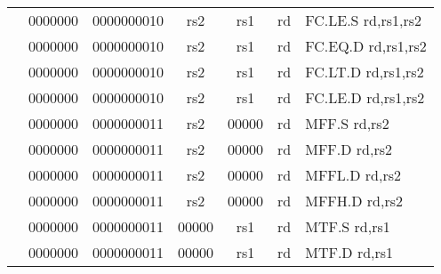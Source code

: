 \begin{table}[p]
\begin{small}
\begin{center}
\begin{tabular}{rcccccccccl}
&
\multicolumn{1}{|c|}{0000000} &
\multicolumn{5}{c|}{0000000010} &
\multicolumn{1}{c|}{rs2} &
\multicolumn{1}{c|}{rs1} &
\multicolumn{1}{c|}{rd} & FC.LE.S rd,rs1,rs2 \\
\cline{2-10}
  

&
\multicolumn{1}{|c|}{0000000} &
\multicolumn{5}{c|}{0000000010} &
\multicolumn{1}{c|}{rs2} &
\multicolumn{1}{c|}{rs1} &
\multicolumn{1}{c|}{rd} & FC.EQ.D rd,rs1,rs2 \\
\cline{2-10}
  

&
\multicolumn{1}{|c|}{0000000} &
\multicolumn{5}{c|}{0000000010} &
\multicolumn{1}{c|}{rs2} &
\multicolumn{1}{c|}{rs1} &
\multicolumn{1}{c|}{rd} & FC.LT.D rd,rs1,rs2 \\
\cline{2-10}
  

&
\multicolumn{1}{|c|}{0000000} &
\multicolumn{5}{c|}{0000000010} &
\multicolumn{1}{c|}{rs2} &
\multicolumn{1}{c|}{rs1} &
\multicolumn{1}{c|}{rd} & FC.LE.D rd,rs1,rs2 \\
\cline{2-10}
  

&
\multicolumn{1}{|c|}{0000000} &
\multicolumn{5}{c|}{0000000011} &
\multicolumn{1}{c|}{rs2} &
\multicolumn{1}{c|}{00000} &
\multicolumn{1}{c|}{rd} & MFF.S rd,rs2 \\
\cline{2-10}
  

&
\multicolumn{1}{|c|}{0000000} &
\multicolumn{5}{c|}{0000000011} &
\multicolumn{1}{c|}{rs2} &
\multicolumn{1}{c|}{00000} &
\multicolumn{1}{c|}{rd} & MFF.D rd,rs2 \\
\cline{2-10}
  

&
\multicolumn{1}{|c|}{0000000} &
\multicolumn{5}{c|}{0000000011} &
\multicolumn{1}{c|}{rs2} &
\multicolumn{1}{c|}{00000} &
\multicolumn{1}{c|}{rd} & MFFL.D rd,rs2 \\
\cline{2-10}
  

&
\multicolumn{1}{|c|}{0000000} &
\multicolumn{5}{c|}{0000000011} &
\multicolumn{1}{c|}{rs2} &
\multicolumn{1}{c|}{00000} &
\multicolumn{1}{c|}{rd} & MFFH.D rd,rs2 \\
\cline{2-10}
  

&
\multicolumn{1}{|c|}{0000000} &
\multicolumn{5}{c|}{0000000011} &
\multicolumn{1}{c|}{00000} &
\multicolumn{1}{c|}{rs1} &
\multicolumn{1}{c|}{rd} & MTF.S rd,rs1 \\
\cline{2-10}
  

&
\multicolumn{1}{|c|}{0000000} &
\multicolumn{5}{c|}{0000000011} &
\multicolumn{1}{c|}{00000} &
\multicolumn{1}{c|}{rs1} &
\multicolumn{1}{c|}{rd} & MTF.D rd,rs1 \\
\cline{2-10}
  


\end{tabular}
\end{center}
\end{small}
\end{table}
